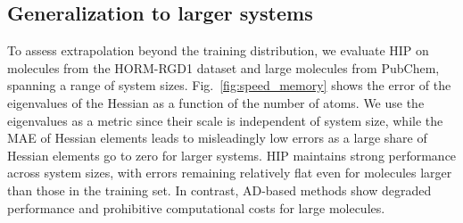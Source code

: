 \documentclass[pdflatex,sn-mathphys-num]{sn-jnl}%
\theoremstyle{thmstyleone}%
\theoremstyle{thmstyletwo}%
\theoremstyle{thmstylethree}%
\begin{document}
\subsection{Generalization to larger systems}

To assess extrapolation beyond the training distribution, we evaluate HIP on molecules from the HORM-RGD1 dataset and large molecules from PubChem, spanning a range of system sizes. Fig.~\ref{fig:speed_memory} shows the error of the eigenvalues of the Hessian as a function of the number of atoms. We use the eigenvalues as a metric since their scale is independent of system size, while the MAE of Hessian elements leads to misleadingly low errors as a large share of Hessian elements go to zero for larger systems. 
HIP maintains strong performance across system sizes, with errors remaining relatively flat even for molecules larger than those in the training set. 
In contrast, AD-based methods show degraded performance and prohibitive computational costs for large molecules.

\end{document}
